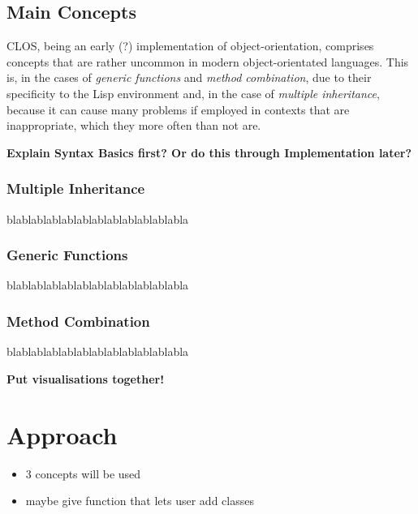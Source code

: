 \documentclass[oribibl]{llncs}
\begin{document}
\subsection{Main Concepts}
\label{sec:concepts}

CLOS, being an early (?) implementation of object-orientation, comprises concepts that are rather uncommon in modern object-orientated languages. This is, in the cases of \emph{generic functions} and \emph{method combination}, due to their specificity to the Lisp environment and, in the case of \emph{multiple inheritance}, because it can cause many problems if employed in contexts that are inappropriate, which they more often than not are. \cite{XXX}

\textbf{Explain Syntax Basics first? Or do this through Implementation later?}

\subsubsection{Multiple Inheritance}
\label{sec:mulinh}
blablablablablablablablablablablabla

\subsubsection{Generic Functions}
\label{sec:genfun}
blablablablablablablablablablablabla

\subsubsection{Method Combination}
\label{sec:metcom}
blablablablablablablablablablablabla

\textbf{Put visualisations together!}





\section{Approach}
\label{sec:approach}


\begin{itemize}
\item 3 concepts will be used
\item maybe give function that lets user add classes
\end{itemize}
\end{document}
